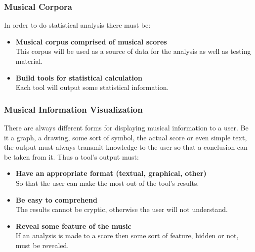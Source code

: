 \subsubsection*{Musical Corpora}

In order to do statistical analysis there must be:

\begin{itemize}
  \item \textbf{Musical corpus comprised of musical scores} \hfill\\
    This corpus will be used as a source of data for the analysis as well as testing material.
  \item \textbf{Build tools for statistical calculation} \hfill\\
    Each tool will output some statistical information.
\end{itemize}

\subsubsection*{Musical Information Visualization}

There are always different forms for displaying musical information to a user. Be it a graph, a
drawing, some sort of symbol, the actual score or even simple text, the output must always transmit
knowledge to the user so that a conclusion can be taken from it. Thus a tool's output must:

\begin{itemize}
  \item \textbf{Have an appropriate format (textual, graphical, other)} \hfill\\
    So that the user can make the most out of the tool's results.
  \item \textbf{Be easy to comprehend} \hfill\\
    The results cannot be cryptic, otherwise the user will not understand.  
  \item \textbf{Reveal some feature of the music} \hfill\\
    If an analysis is made to a score then some sort of feature, hidden or not, must be revealed.
\end{itemize}

